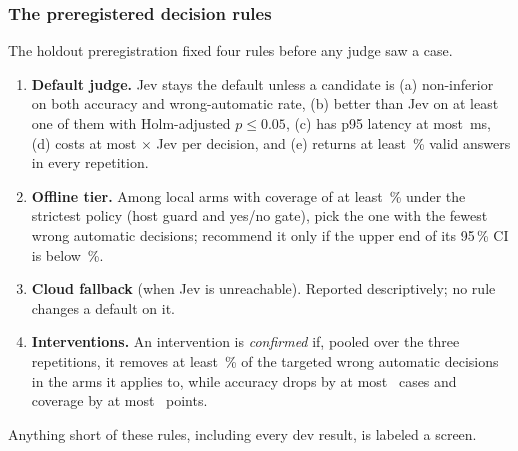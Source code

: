 \subsubsection{The preregistered decision rules}\label{jb:sec:rules}

The holdout preregistration fixed four rules before any judge saw a case.
\begin{enumerate}
  \item \textbf{Default judge.} Jev stays the default unless a candidate is (a) non-inferior on both
    accuracy and wrong-automatic rate, (b) better than Jev on at least one of them with Holm-adjusted
    $p \le 0.05$, (c) has p95 latency at most \RuleOneMaxPninetyfive\,ms, (d) costs at most
    \RuleOneCostX$\times$ Jev per decision, and (e) returns at least \RuleOneValidShare\,\% valid answers
    in every repetition.
  \item \textbf{Offline tier.} Among local arms with coverage of at least \OffMinCovPct\,\% under the
    strictest policy (host guard and yes/no gate), pick the one with the fewest wrong automatic
    decisions; recommend it only if the upper end of its 95\,\% CI is below \OffMaxUpperPct\,\%.
  \item \textbf{Cloud fallback} (when Jev is unreachable). Reported descriptively; no rule changes a
    default on it.
  \item \textbf{Interventions.} An intervention is \emph{confirmed} if, pooled over the three
    repetitions, it removes at least \IConfirmReductionPct\,\% of the targeted wrong automatic decisions in the
    arms it applies to, while accuracy drops by at most \IConfirmAccCases\ cases and coverage by at most
    \IConfirmCovPts\ points.
\end{enumerate}
Anything short of these rules, including every dev result, is labeled a screen.
